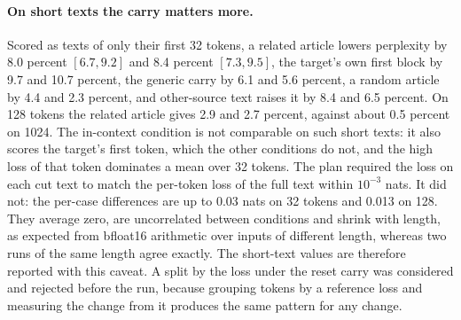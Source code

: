 \documentclass[12pt,a4paper]{report}
\begin{document}
\paragraph{On short texts the carry matters more.} Scored as texts of only their first 32 tokens, a related article lowers perplexity by 8.0 percent $[6.7, 9.2]$ and 8.4 percent $[7.3, 9.5]$, the target's own first block by 9.7 and 10.7 percent, the generic carry by 6.1 and 5.6 percent, a random article by 4.4 and 2.3 percent, and other-source text raises it by 8.4 and 6.5 percent. On 128 tokens the related article gives 2.9 and 2.7 percent, against about 0.5 percent on 1024. The in-context condition is not comparable on such short texts: it also scores the target's first token, which the other conditions do not, and the high loss of that token dominates a mean over 32 tokens. The plan required the loss on each cut text to match the per-token loss of the full text within $10^{-3}$ nats. It did not: the per-case differences are up to 0.03 nats on 32 tokens and 0.013 on 128. They average zero, are uncorrelated between conditions and shrink with length, as expected from bfloat16 arithmetic over inputs of different length, whereas two runs of the same length agree exactly. The short-text values are therefore reported with this caveat. A split by the loss under the reset carry was considered and rejected before the run, because grouping tokens by a reference loss and measuring the change from it produces the same pattern for any change.

\begin{table}[H]
  \centering
  \caption{Mean gain per token over a reset carry, in nats, by position in the target, on the 200 confirmatory cases at step 600. Positive values mean lower loss.}
  \label{tab-position}
  \small
\end{table}
\end{document}
